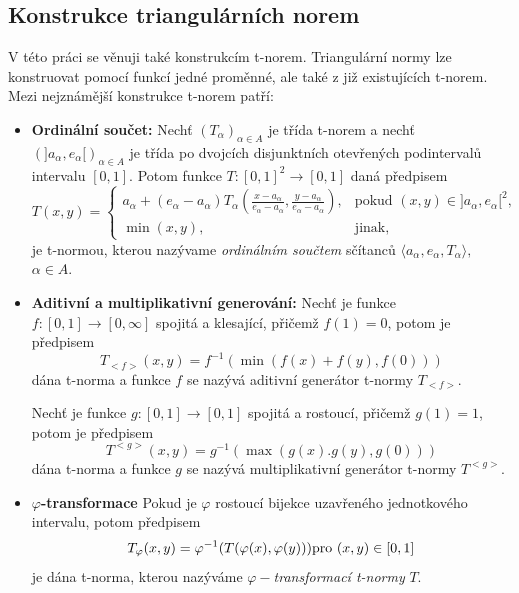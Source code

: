 \subsection{Konstrukce triangulárních norem}

V t\'eto pr\'aci se v\v enuji tak\'e konstrukc\'im t-norem. Triangul\'arn\'i normy lze konstruovat pomoc\'i funkc\'i jedn\'e prom\v enn\'e, ale tak\'e z ji\v z existuj\'ic\'ich t-norem. Mezi nejznámější konstrukce t-norem patří:
\begin{itemize}
    \item \textbf{Ordinální součet:}
    \cite{KMP}
        Nech\v t $(T_\alpha)_{\alpha \in A}$ je třída t-norem a
        nech\v t $(]a_\alpha,e_\alpha[)_{\alpha \in A}$ je třída po dvojcích
        disjunktních otevřených podinterval\r u intervalu $[0,1].$ Potom funkce
        \hbox{$T:[0,1]^2\rightarrow [0,1]$} daná předpisem
        $$T(x,y)=\begin{cases} a_\alpha + (e_\alpha - a_\alpha )T_\alpha (\frac
        {x-a_\alpha}{e_\alpha - a_\alpha}, \frac {y-a_\alpha}{e_\alpha - a_\alpha}),
        &\mbox {pokud $(x,y) \in ]a_\alpha ,e_\alpha [^2$,}
        \\\min(x,y), &\mbox {jinak,} \end{cases}$$
        je t-normou, kterou nazývame {\em ordinálním součtem} sčítanc\r u $\langle a_\alpha ,e_\alpha
        ,T_\alpha \rangle,$ \mbox{$ \alpha \in A.$}

    \item \textbf{Aditivní a multiplikativní generování:}
        \cite{KMP}
        Nech\v t je funkce $f:[0,1] \to [0,\infty]$ spojitá a klesající, přičemž
        $f(1)=0$, potom je předpisem
        $$ T_{<f>}(x,y)=f^{-1}(\min(f(x)+f(y),f(0)))$$
        dána t-norma a funkce $f$ se nazývá aditivní generátor t-normy
        $T_{<f>}.$
        
        Nech\v t je funkce $g:[0,1] \to [0,1]$ spojitá a rostoucí, přičemž
        $g(1)=1$, potom je předpisem
        $$ T^{<g>}(x,y)=g^{-1}(\max(g(x).g(y),g(0)))$$
        dána t-norma a funkce $g$ se nazývá multiplikativní generátor t-normy
        $T^{<g>}.$
    \item \textbf{$\varphi$-transformace}
        \cite{KMP}
        Pokud je $\varphi$ rostoucí bijekce uzavřeného jednotkového intervalu, potom
        předpisem
        $$T_\varphi (x,y)=\varphi ^{-1}(T(\varphi(x),\varphi(y)))\space \text {pro $(x,y)
        \in [0,1]$}$$
        je dána t-norma, kterou nazýváme $\varphi-${\em transformací t-normy}
        $T.$

\end{itemize}

